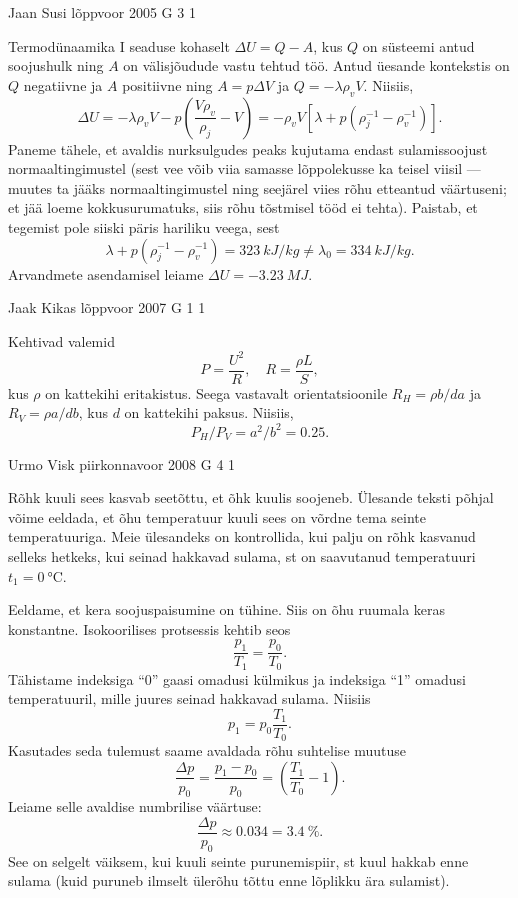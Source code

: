 \documentclass[11pt]{article}
\begin{document}
{%
{Jaan Susi} %
{lõppvoor} %
{2005} %
{G 3} %
{1} %
{

\ifSolution
Termodünaamika I seaduse kohaselt $\Delta U = Q - A$, kus $Q$ on süsteemi antud soojushulk ning $A$ on välisjõudude vastu tehtud töö. Antud üesande kontekstis on $Q$ negatiivne ja $A$ positiivne ning $A = p\Delta V$ ja $Q = -\lambda \rho_vV$. Niisiis,
\[
\Delta U=-\lambda \rho_{v} V-p\left(\frac{V \rho_{v}}{\rho_{j}}-V\right)=-\rho_{v} V\left[\lambda+p\left(\rho_{j}^{-1}-\rho_{v}^{-1}\right)\right].
\]
Paneme tähele, et avaldis nurksulgudes peaks kujutama endast sulamissoojust normaaltingimustel (sest vee võib viia samasse lõppolekusse ka teisel viisil --- muutes ta jääks normaaltingimustel ning seejärel viies rõhu etteantud väärtuseni; et jää loeme kokkusurumatuks, siis rõhu tõstmisel tööd ei tehta). Paistab, et tegemist pole siiski päris hariliku veega, sest
\[
\lambda+p\left(\rho_{j}^{-1}-\rho_{v}^{-1}\right)= \SI{323}{kJ/kg} \neq \lambda_{0}=\SI{334}{kJ/kg}.
\]
Arvandmete asendamisel leiame $\Delta U = \SI{-3,23}{MJ}$.
\fi
}

{Jaak Kikas} %
{lõppvoor} %
{2007} %
{G 1} %
{1} %
{

\ifSolution
Kehtivad valemid
\[
P=\frac{U^{2}}{R}, \quad R=\frac{\rho L}{S},
\]
kus $\rho$ on kattekihi eritakistus. Seega vastavalt orientatsioonile $R_H = \rho b/da$ ja $R_V = \rho a/db$, kus $d$ on kattekihi paksus. Niisiis,
\[
P_H/P_V = a ^2/b^2 = \num{0,25}.
\]

\fi
}

{Urmo Visk} %
{piirkonnavoor} %
{2008} %
{G 4} %
{1} %
{

\ifSolution
Rõhk kuuli sees kasvab seetõttu, et õhk kuulis soojeneb. Ülesande teksti põhjal võime eeldada, et õhu temperatuur kuuli sees on võrdne tema seinte temperatuuriga. Meie ülesandeks on kontrollida, kui palju on rõhk kasvanud selleks hetkeks, kui seinad hakkavad sulama, st on saavutanud temperatuuri $t_1 = \SI{0}{\celsius}$. 

Eeldame, et kera soojuspaisumine on tühine. Siis on õhu ruumala keras konstantne. Isokoorilises protsessis kehtib seos 
\[
\frac{p_1}{T_1} = \frac{p_0}{T_0}.
\]
Tähistame indeksiga \enquote{0} gaasi omadusi külmikus ja indeksiga \enquote{1} omadusi temperatuuril, mille juures seinad hakkavad sulama. Niisiis 
\[
p_1 = p_0 \frac{T_1}{T_0}.
\] 
Kasutades seda tulemust saame avaldada rõhu suhtelise muutuse 
\[
\frac{\Delta p}{p_{0}}=\frac{p_{1}-p_{0}}{p_{0}}=\left(\frac{T_{1}}{T_{0}}-1\right).
\]
Leiame selle avaldise numbrilise väärtuse: 
\[
\frac{\Delta p}{p_0} \approx \num{0,034} = \SI{3,4}{\%}.
\] 
See on selgelt väiksem, kui kuuli seinte purunemispiir, st kuul hakkab enne sulama (kuid puruneb ilmselt ülerõhu tõttu enne lõplikku ära sulamist). 

}}
\end{document}
